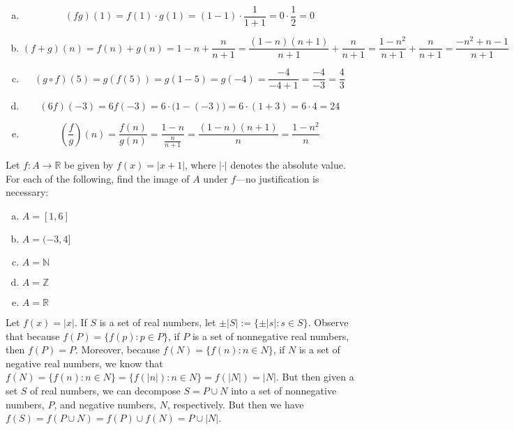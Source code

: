 \documentclass[11pt,letterpaper]{article}
\begin{document}
\sol 
\begin{enumerate}[(a)]
\item 
	\[
	(fg)(1)= f(1) \cdot g(1)= (1 - 1) \cdot \dfrac{1}{1 + 1}= 0 \cdot \dfrac{1}{2}= 0
	\] \pspace

\item 
	\[
	(f + g)(n)= f(n) + g(n)= 1 - n + \dfrac{n}{n + 1}= \dfrac{(1 - n)(n + 1)}{n + 1} + \dfrac{n}{n + 1}= \dfrac{1 - n^2}{n + 1} + \dfrac{n}{n + 1}= \dfrac{-n^2 + n - 1}{n + 1}
	\] \pspace

\item 
	\[
	(g \circ f)(5)= g(f(5))= g(1 - 5)= g(-4)= \dfrac{-4}{-4 + 1}= \dfrac{-4}{-3}= \dfrac{4}{3}
	\] \pspace

\item 
	\[
	(6f)(-3)= 6 f(-3)= 6 \cdot \big(1 - (-3) \big)= 6 \cdot (1 + 3)= 6 \cdot 4= 24
	\] \pspace

\item 
	\[
	\left( \dfrac{f}{g} \right)(n)= \dfrac{f(n)}{g(n)}= \dfrac{1 - n}{\frac{n}{n + 1}}= \dfrac{(1 - n)(n + 1)}{n}= \dfrac{1 - n^2}{n}
	\]
\end{enumerate}



\newpage



 Let $f: A \to \mathbb{R}$ be given by $f(x)= |x + 1|$, where $| \cdot |$ denotes the absolute value. For each of the following, find the image of $A$ under $f$---no justification is necessary: 
	\begin{enumerate}[(a)]
	\item $A= [1, 6]$
	\item $A= (-3, 4]$
	\item $A= \mathbb{N}$
	\item $A= \mathbb{Z}$
	\item $A= \mathbb{R}$
	\end{enumerate}

\sol Let $f(x)= |x|$. If $S$ is a set of real numbers, let $\pm |S|:= \{ \pm |s| \colon s \in S \}$. Observe that because $f(P)= \{ f(p) \colon p \in P \}$, if $P$ is a set of nonnegative real numbers, then $f(P)= P$. Moreover, because $f(N)= \{ f(n) \colon n \in N \}$, if $N$ is a set of negative real numbers, we know that $f(N)= \{ f(n) \colon n \in N \}= \{ f(|n|) \colon n \in N \}= f(|N|)= |N|$. But then given a set $S$ of real numbers, we can decompose $S= P \cup N$ into a set of nonnegative numbers, $P$, and negative numbers, $N$, respectively. But then we have $f(S)= f(P \cup N)= f(P) \cup f(N)= P \cup |N|$. 
\end{document}
